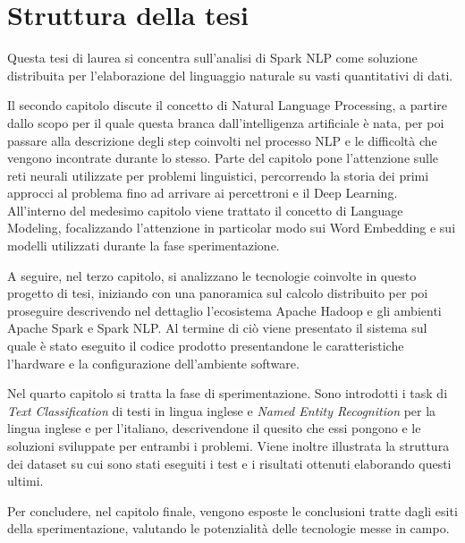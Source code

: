 \section{Struttura della tesi}  \label{struttura_tesi}
Questa tesi di laurea si concentra sull'analisi di Spark NLP come soluzione distribuita per l'elaborazione del linguaggio naturale su vasti quantitativi di dati.

Il secondo capitolo discute il concetto di Natural Language Processing, a partire dallo scopo per il quale questa branca dall'intelligenza artificiale è nata, per poi passare alla descrizione degli step coinvolti nel processo NLP e le difficoltà che vengono incontrate durante lo stesso. Parte del capitolo pone l'attenzione sulle reti neurali utilizzate per problemi linguistici, percorrendo la storia dei primi approcci al problema fino ad arrivare ai percettroni e il Deep Learning.
All'interno del medesimo capitolo viene trattato il concetto di Language Modeling, focalizzando l'attenzione in particolar modo sui Word Embedding e sui modelli utilizzati durante la fase sperimentazione.

A seguire, nel terzo capitolo, si analizzano le tecnologie coinvolte in questo progetto di tesi, iniziando con una panoramica sul calcolo distribuito per poi proseguire descrivendo nel dettaglio l'ecosistema Apache Hadoop e gli ambienti Apache Spark e Spark NLP. Al termine di ciò viene presentato il sistema sul quale è stato eseguito il codice prodotto presentandone le caratteristiche l'hardware e la configurazione dell'ambiente software.

Nel quarto capitolo si tratta la fase di sperimentazione. Sono introdotti i task di \textit{Text Classification} di testi in lingua inglese e \textit{Named Entity Recognition} per la lingua inglese e per l'italiano, descrivendone il quesito che essi pongono e le soluzioni sviluppate per entrambi i problemi. Viene inoltre illustrata la struttura dei dataset su cui sono stati eseguiti i test e i risultati ottenuti elaborando questi ultimi.

Per concludere, nel capitolo finale, vengono esposte le conclusioni tratte dagli esiti della sperimentazione, valutando le potenzialità delle tecnologie messe in campo.